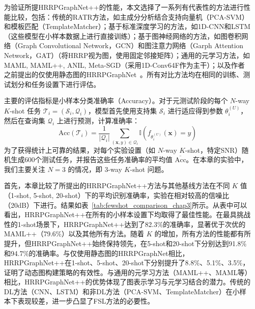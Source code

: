 为验证所提HRRPGraphNet++的性能，本文选择了一系列有代表性的方法进行性能比较，包括：传统的RATR方法，如主成分分析结合支持向量机（PCA-SVM）和模板匹配（TemplateMatcher）；基于标准深度学习的方法，如1D-CNN和LSTM（这些模型在小样本数据上进行直接训练）；基于图神经网络的方法，如图卷积网络（Graph Convolutional Network，GCN）和图注意力网络（Garph Attention Network，GAT）（将HRRP视为图，使用固定邻接矩阵）；通用的元学习方法，如MAML, MAML++, ANIL, Meta-SGD（采用1D-Conv64F作为主干）；以及作者之前提出的仅使用静态图的HRRPGraphNet~\cite{chen_hrrpgraphnet_2024}。所有对比方法均在相同的训练、测试划分和任务设置下进行评估。

主要的评估指标是小样本分类准确率（Accuracy）。对于元测试阶段的每个 $N$-way $K$-shot 任务 $\mathcal{T}_i = (\mathcal{S}_i, \mathcal{Q}_i)$，模型首先使用支持集 $\mathcal{S}_i$ 进行适应得到参数 $\theta_i^{(U)}$，然后在查询集 $\mathcal{Q}_i$ 上进行预测，计算准确率：
\begin{equation}
    \text{Acc}(\mathcal{T}_i) = \frac{1}{|\mathcal{Q}_i|} \sum_{(\mathbf{x},y) \in \mathcal{Q}_i} \mathbb{I}(f_{\theta_i^{(U)}}(\mathbf{x}) = y)
    \label{eq:accuracy_metric}
\end{equation}
为了获得统计上可靠的结果，对每个实验设置（如 $N$-way $K$-shot，特定SNR）随机生成600个测试任务，并报告这些任务准确率的平均值 $\overline{\text{Acc}}$。在本章的实验中，我们主要关注 $N=3$ 的情况，即 3-way $K$-shot 问题。

首先，本章比较了所提出的HRRPGraphNet++方法与其他基线方法在不同 $K$ 值（1-shot, 5-shot, 20-shot）下的平均识别准确率，实验在相对较高的信噪比（20dB）下进行。结果如表~\ref{tab:fewshot_comparison_chap3}所示。从表中可以看出，HRRPGraphNet++在所有的小样本设置下均取得了最佳性能。在最具挑战性的1-shot场景下，HRRPGraphNet++达到了82.3\%的准确率，显著优于次优的MAML++（79.6\%）以及其他所有方法。随着 $K$ 的增加，所有方法的性能都有所提升，但HRRPGraphNet++始终保持领先，在5-shot和20-shot下分别达到91.8\%和94.7\%的准确率。与仅使用静态图的HRRPGraphNet相比，HRRPGraphNet++在1-shot、5-shot、20-shot下分别提升了8.8\%、5.1\%、3.5\%，证明了动态图构建策略的有效性。与通用的元学习方法（MAML++、MAML等）相比，HRRPGraphNet++的优势体现了图表示学习与元学习结合的潜力。传统的DL方法（CNN、LSTM）和非DL方法（PCA-SVM、TemplateMatcher）在小样本下表现较差，进一步凸显了FSL方法的必要性。

